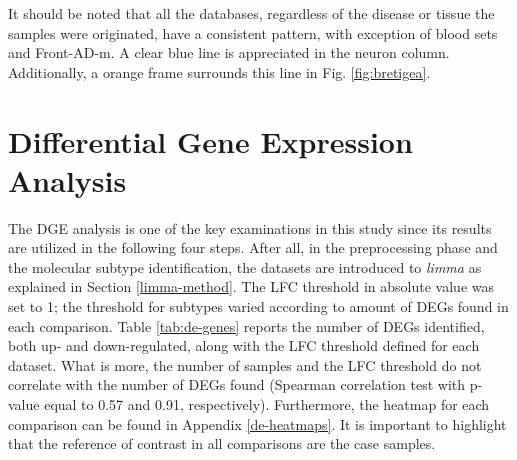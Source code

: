 It should be noted that all the databases, regardless of the disease or tissue the samples were originated, have a consistent pattern, with exception of blood sets and Front-AD-m. A clear blue line is appreciated in the neuron column. Additionally, a orange frame surrounds this line in Fig. \ref{fig:bretigea}.

\section{Differential Gene Expression Analysis} \label{res-dgea}

The DGE analysis is one of the key examinations in this study since its results are utilized in the following four steps. After all, in the preprocessing phase and the molecular subtype identification, the datasets are introduced to \textit{limma} as explained in Section \ref{limma-method}. The LFC threshold in absolute value was set to 1; the threshold for subtypes varied according to amount of DEGs found in each comparison. Table \ref{tab:de-genes} reports the number of DEGs identified, both up- and down-regulated, along with the LFC threshold defined for each dataset. What is more, the number of samples and the LFC threshold do not correlate with the number of DEGs found (Spearman correlation test with p-value equal to 0.57 and 0.91, respectively). Furthermore, the heatmap for each comparison can be found in Appendix \ref{de-heatmaps}. It is important to highlight that the reference of contrast in all comparisons are the case samples.

